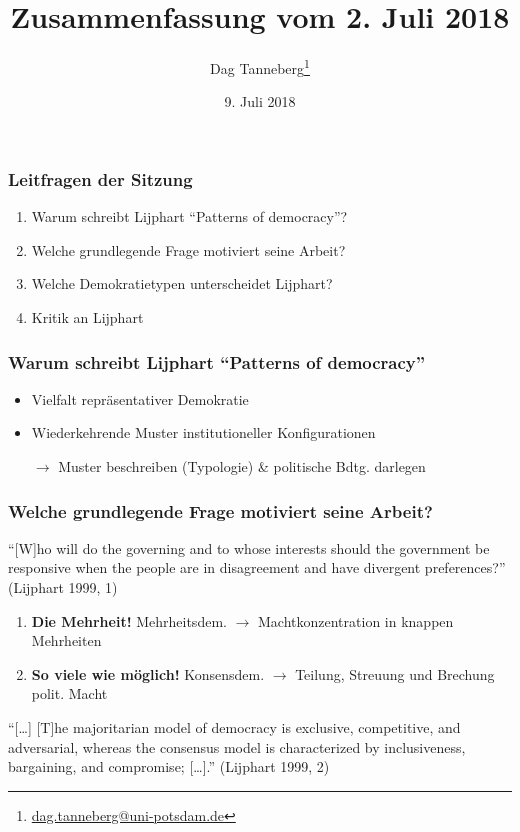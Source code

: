 \documentclass{beamer}
\title{Zusammenfassung vom 2. Juli 2018}
\author{Dag Tanneberg\thanks{%
  \href{mailto:dag.tanneberg@uni-potsdam.de}%
    {dag.tanneberg@uni-potsdam.de}
  }
}
\institute[Universität Potsdam]{
  {\glqq}Grundlagen der Vergleichenden Politikwissenschaft{\grqq}\\
  Universität Potsdam\\
  Lehrstuhl für Vergleichende Politikwissenschaft\\
  Sommersemester 2018
}
\date{9. Juli 2018}
\begin{document}
\maketitle

\begin{frame}
\frametitle{Leitfragen der Sitzung}
\begin{enumerate}
  \item Warum schreibt Lijphart ``Patterns of democracy''?
  \item Welche grundlegende Frage motiviert seine Arbeit?
  \item Welche Demokratietypen unterscheidet Lijphart?
  \item Kritik an Lijphart
\end{enumerate}
\end{frame}

\begin{frame}
\frametitle{Warum schreibt Lijphart ``Patterns of democracy''}
\begin{itemize}
  \item Vielfalt repräsentativer Demokratie
  \item Wiederkehrende Muster institutioneller Konfigurationen
  \item [$\rightarrow$] Muster beschreiben (Typologie) \&
    politische Bdtg. darlegen
\end{itemize}
\end{frame}

\begin{frame}
\frametitle{Welche grundlegende Frage motiviert seine Arbeit?}
  ``[W]ho will do the governing and to whose
  interests should the government be responsive when the
  people are in disagreement and have divergent
  preferences?''
  (Lijphart 1999, 1)

\begin{enumerate}
  \item \textbf{Die Mehrheit!} \newline
    Mehrheitsdem. $\rightarrow$ Machtkonzentration in knappen
    Mehrheiten
  \item \textbf{So viele wie möglich!} \newline
    Konsensdem. $\rightarrow$ Teilung, Streuung und Brechung
    polit. Macht
\end{enumerate}

  ``[\dots] [T]he majoritarian model of democracy is exclusive,
  competitive, and adversarial, whereas the consensus model
  is characterized by inclusiveness, bargaining, and
  compromise; [\dots].'' (Lijphart 1999, 2)
\end{frame}
\end{document}
